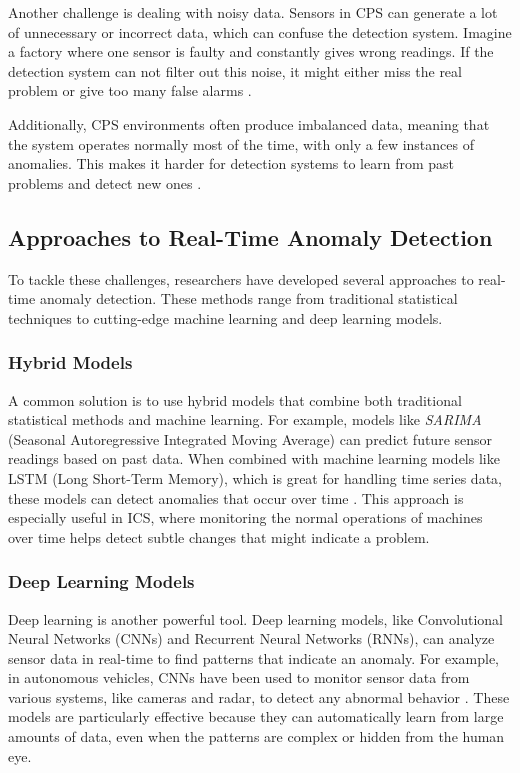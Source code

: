 Another challenge is dealing with noisy data. Sensors in CPS can generate a lot of unnecessary or incorrect data, which can confuse the detection system. Imagine a factory where one sensor is faulty and constantly gives wrong readings. If the detection system can not filter out this noise, it might either miss the real problem or give too many false alarms \cite{98,60}.

Additionally, CPS environments often produce imbalanced data, meaning that the system operates normally most of the time, with only a few instances of anomalies. This makes it harder for detection systems to learn from past problems and detect new ones \cite{60,50}.

\subsection{Approaches to Real-Time Anomaly Detection}

To tackle these challenges, researchers have developed several approaches to real-time anomaly detection. These methods range from traditional statistical techniques to cutting-edge machine learning and deep learning models.

\subsubsection{Hybrid Models}
A common solution is to use hybrid models that combine both traditional statistical methods and machine learning. For example, models like \textit{SARIMA} (Seasonal Autoregressive Integrated Moving Average) can predict future sensor readings based on past data. When combined with machine learning models like LSTM (Long Short-Term Memory), which is great for handling time series data, these models can detect anomalies that occur over time \cite{60}. This approach is especially useful in ICS, where monitoring the normal operations of machines over time helps detect subtle changes that might indicate a problem.

\subsubsection{Deep Learning Models}
Deep learning is another powerful tool. Deep learning models, like Convolutional Neural Networks (CNNs) and Recurrent Neural Networks (RNNs), can analyze sensor data in real-time to find patterns that indicate an anomaly. For example, in autonomous vehicles, CNNs have been used to monitor sensor data from various systems, like cameras and radar, to detect any abnormal behavior \cite{97,99}. These models are particularly effective because they can automatically learn from large amounts of data, even when the patterns are complex or hidden from the human eye.

